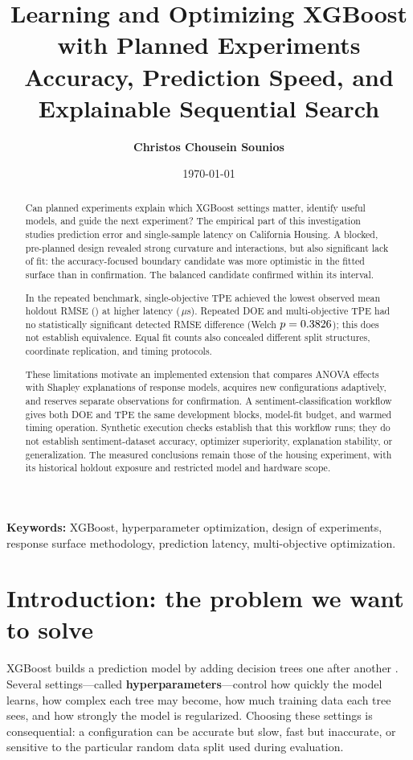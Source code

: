 \documentclass[12pt,a4paper]{article}
\title{\textbf{Learning and Optimizing XGBoost with Planned Experiments}\\[0.35em]\large Accuracy, Prediction Speed, and Explainable Sequential Search}
\author{\textbf{Christos Chousein Sounios}}
\date{\today}
\newcommand{\term}[1]{\textbf{#1}}
\begin{document}
\maketitle
\begin{abstract}
Can planned experiments explain which XGBoost settings matter, identify useful models, and guide the next experiment? The empirical part of this investigation studies prediction error and single-sample latency on California Housing. A blocked, pre-planned design revealed strong curvature and interactions, but also significant lack of fit: the accuracy-focused boundary candidate was more optimistic in the fitted surface than in confirmation. The balanced candidate confirmed within its interval.

In the repeated benchmark, single-objective TPE achieved the lowest observed mean holdout RMSE (\numRevSoTpeTestRMSE) at higher latency (\numRevSoTpePredictLat\,$\mu$s). Repeated DOE and multi-objective TPE had no statistically significant detected RMSE difference (Welch $p=0.3826$); this does not establish equivalence. Equal fit counts also concealed different split structures, coordinate replication, and timing protocols.

These limitations motivate an implemented extension that compares ANOVA effects with Shapley explanations of response models, acquires new configurations adaptively, and reserves separate observations for confirmation. A sentiment-classification workflow gives both DOE and TPE the same development blocks, model-fit budget, and warmed timing operation. Synthetic execution checks establish that this workflow runs; they do not establish sentiment-dataset accuracy, optimizer superiority, explanation stability, or generalization. The measured conclusions remain those of the housing experiment, with its historical holdout exposure and restricted model and hardware scope.
\end{abstract}
\noindent\textbf{Keywords:} XGBoost, hyperparameter optimization, design of experiments, response surface methodology, prediction latency, multi-objective optimization.
\clearpage
\setcounter{tocdepth}{2}
\begingroup
\small
\setlength{\parskip}{0pt}
\tableofcontents
\endgroup
\clearpage

\section{Introduction: the problem we want to solve}
XGBoost builds a prediction model by adding decision trees one after another \cite{chen2016xgboost}. Several settings---called \term{hyperparameters}---control how quickly the model learns, how complex each tree may become, how much training data each tree sees, and how strongly the model is regularized. Choosing these settings is consequential: a configuration can be accurate but slow, fast but inaccurate, or sensitive to the particular random data split used during evaluation.
\end{document}
